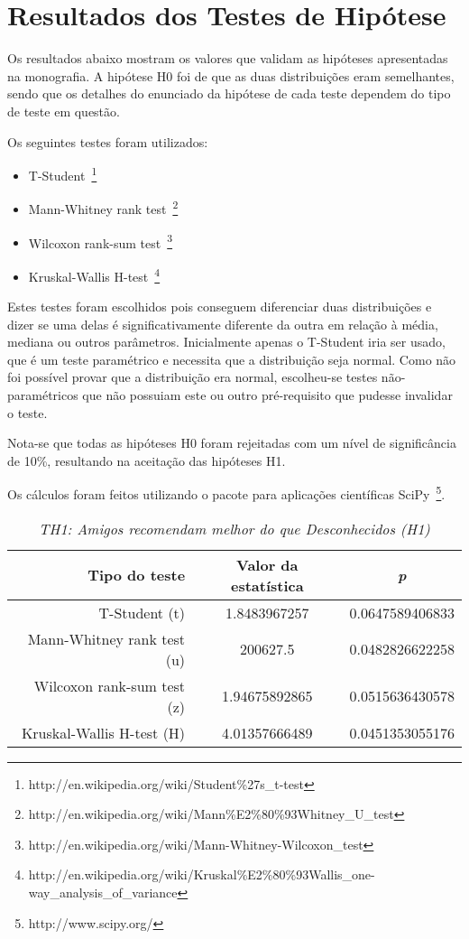 \appendix
\chapter{Resultados dos Testes de Hipótese}
\label{anexo_hipoteses}

Os resultados abaixo mostram os valores que validam as hipóteses apresentadas na monografia. A hipótese H0 foi de que as duas distribuições eram semelhantes, sendo que os detalhes do enunciado da hipótese de cada teste dependem do tipo de teste em questão.

Os seguintes testes foram utilizados:

\begin{itemize}
    \item T-Student~\footnote{http://en.wikipedia.org/wiki/Student\%27s\_t-test}
    \item Mann-Whitney rank test~\footnote{http://en.wikipedia.org/wiki/Mann\%E2\%80\%93Whitney\_U\_test}
    \item Wilcoxon rank-sum test~\footnote{http://en.wikipedia.org/wiki/Mann-Whitney-Wilcoxon\_test}
    \item Kruskal-Wallis H-test~\footnote{http://en.wikipedia.org/wiki/Kruskal\%E2\%80\%93Wallis\_one-way\_analysis\_of\_variance}

\end{itemize}

Estes testes foram escolhidos pois conseguem diferenciar duas distribuições e dizer se uma delas é significativamente diferente da outra em relação à média, mediana ou outros parâmetros. Inicialmente apenas o T-Student iria ser usado, que é um teste paramétrico e necessita que a distribuição seja normal. Como não foi possível provar que a distribuição era normal, escolheu-se testes não-paramétricos que não possuiam este ou outro pré-requisito que pudesse invalidar o teste.


Nota-se que todas as hipóteses H0 foram rejeitadas com um nível de significância de 10\%, resultando na aceitação das hipóteses H1.

Os cálculos foram feitos utilizando o pacote para aplicações científicas SciPy~\footnote{http://www.scipy.org/}.

\begin{table}
\centering
\begin{tabular}{|r|c|c|}
    \hline
    \textbf{Tipo do teste} & \textbf{Valor da estatística} & \textbf{\textit{p}} \\
    \hline
T-Student (t) & 1.8483967257 & 0.0647589406833 \\
\hline 
Mann-Whitney rank test (u) & 200627.5 & 0.0482826622258 \\
\hline 
Wilcoxon rank-sum test (z) & 1.94675892865 & 0.0515636430578 \\
\hline 
Kruskal-Wallis H-test (H) & 4.01357666489 & 0.0451353055176 \\
\hline 

\end{tabular}
\caption{\it TH1: Amigos recomendam melhor do que Desconhecidos (H1)}
\end{table}


